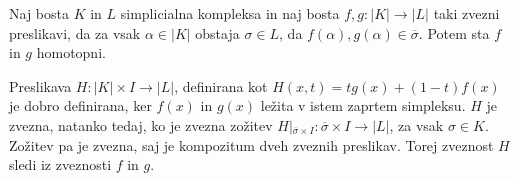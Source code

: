 \documentclass[mat1]{fmfdelo}
\DeclareMathOperator*{\supp}{supp}
\begin{document}
 
 
 
 
 


 \begin{trditev}
    Naj bosta $K$ in $L$ simplicialna kompleksa in naj bosta $f,g\colon |K|\rightarrow |L|$ taki zvezni preslikavi, da za vsak $\alpha\in |K|$ obstaja $\sigma \in L$, da $f(\alpha),g(\alpha) \in \overline{\sigma}.$ Potem sta $f$ in $g$ homotopni.
    \label{tr:shom}
\end{trditev}

\begin{dokaz}
    Preslikava $H\colon |K|\times I\rightarrow |L|$, definirana kot $H(x,t)=tg(x) + (1-t)f(x)$ je dobro definirana, ker $f(x)$ in $g(x)$ ležita v istem zaprtem simpleksu. $H$ je zvezna, natanko tedaj, ko je zvezna zožitev $H|_{\overline{\sigma}\times I}\colon \overline{\sigma}\times I \rightarrow |L|$, za vsak $\sigma \in K$. Zožitev pa je zvezna, saj je kompozitum dveh zveznih preslikav. Torej zveznost $H$ sledi iz zveznosti $f$ in $g$.

\end{dokaz}
\end{document}
